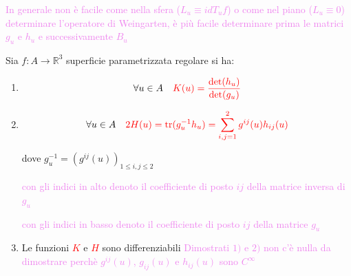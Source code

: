         \textcolor{violet}{In generale non è facile come nella sfera ($L_u \equiv id T_uf$) o come nel piano ($L_u \equiv 0$) determinare l'operatore di Weingarten, è più
        facile determinare prima le matrici $g_u$ e $h_u$ e successivamente $B_u$}
        \newpage

        \begin{proposizione}
        \label{prop:calcolo_curvatura_di_Gauss_e_curvatura_media}
        Sia $f : A \to \mathbb{R}^3$ superficie parametrizzata regolare si ha:
        \begin{enumerate}[label=\textcolor{red}{\arabic*)}]
            \item \begin{equation} \forall u \in A \quad \textcolor{red}{K(u) = \frac{\det(h_u)}{\det(g_u)}} \end{equation}
            \item \begin{equation} \forall u \in A \quad \textcolor{red}{\displaystyle 2 H(u) = \operatorname{tr}(g_u^{-1} h_u) = \sum_{i,j=1}^2 g^{ij}(u) h_{ij}(u)} \end{equation}
            
            dove $g_u^{-1} = (g^{ij}(u))_{1 \le i,j \le 2}$ 
            
            \textcolor{violet}{con gli indici in alto denoto il coefficiente di posto $ij$ della matrice inversa di $g_u$}

            \textcolor{violet}{con gli indici in basso denoto il coefficiente di posto $ij$ della matrice $g_u$}
            \item Le funzioni \textcolor{red}{$K$} e \textcolor{red}{$H$} sono differenziabili \textcolor{violet}{Dimostrati $1)$ e $2)$ non c'è 
            nulla da dimostrare perchè $g^{ij}(u)$, $g_{ij}(u)$ e $h_{ij}(u)$ sono $C^\infty$}
        \end{enumerate}
        \end{proposizione}


